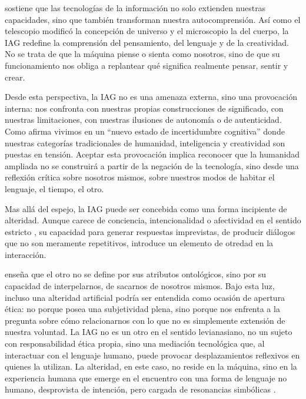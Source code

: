 \documentclass[spanish]{textolivre}
\begin{document}
\textcite{floridi2019} sostiene que las tecnologías de la información no solo extienden nuestras capacidades, sino que también transforman nuestra autocomprensión. Así como el telescopio modificó la concepción de universo y el microscopio la del cuerpo, la IAG redefine la comprensión del pensamiento, del lenguaje y de la creatividad. No se trata de que la máquina piense o sienta como nosotros, sino de que su funcionamiento nos obliga a replantear qué significa realmente pensar, sentir y crear. 

Desde esta perspectiva, la IAG no es una amenaza externa, sino una provocación interna: nos confronta con nuestras propias construcciones de significado, con nuestras limitaciones, con nuestras ilusiones de autonomía o de autenticidad. Como afirma \textcite[p. 29]{bridle2018} vivimos en un “nuevo estado de incertidumbre cognitiva” donde nuestras categorías tradicionales de humanidad, inteligencia y creatividad son puestas en tensión. Aceptar esta provocación implica reconocer que la humanidad ampliada no se construirá a partir de la negación de la tecnología, sino desde una reflexión crítica sobre nosotros mismos, sobre nuestros modos de habitar el lenguaje, el tiempo, el otro.

Mas allá del espejo, la IAG puede ser concebida como una forma incipiente de alteridad. Aunque carece de conciencia, intencionalidad o afectividad en el sentido estricto \cite{boden2016}, su capacidad para generar respuestas imprevistas, de producir diálogos que no son meramente repetitivos, introduce un elemento de otredad en la interacción. 

\textcite{levinas2006} enseña que el otro no se define por sus atributos ontológicos, sino por su capacidad de interpelarnos, de sacarnos de nosotros mismos. Bajo esta luz, incluso una alteridad artificial podría ser entendida como ocasión de apertura ética: no porque posea una subjetividad plena, sino porque nos enfrenta a la pregunta sobre cómo relacionarnos con lo que no es simplemente extensión de nuestra voluntad. La IAG no es un otro en el sentido levianasiano, no un sujeto con responsabilidad ética propia, sino una mediación tecnológica que, al interactuar con el lenguaje humano, puede provocar desplazamientos reflexivos en quienes la utilizan. La alteridad, en este caso, no reside en la máquina, sino en la experiencia humana que emerge en el encuentro con una forma de lenguaje no humano, desprovista de intención, pero cargada de resonancias simbólicas \cite{bridle2018,ferrando2019}.
\end{document}
